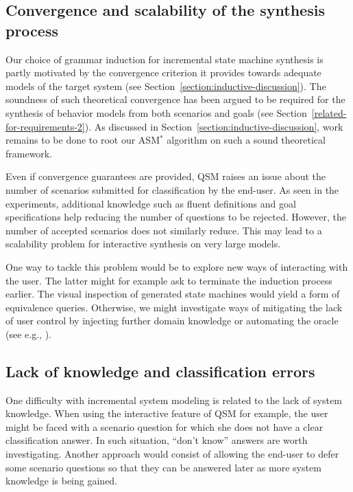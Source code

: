 \subsection*{Convergence and scalability of the synthesis process}

Our choice of grammar induction for incremental state machine synthesis is partly motivated by the convergence criterion it provides towards adequate models of the target system (see Section~\ref{section:inductive-discussion}). The soundness of such theoretical convergence has been argued to be required for the synthesis of behavior models from both scenarios and goals (see Section~\ref{related-for-requirements-2}). As discussed in Section~\ref{section:inductive-discussion}, work remains to be done to root our ASM$^*$ algorithm on such a sound theoretical framework.

Even if convergence guarantees are provided, QSM raises an issue about the number of scenarios submitted for classification by the end-user. As seen in the experiments, additional knowledge such as fluent definitions and goal specifications help reducing the number of questions to be rejected. However, the number of accepted scenarios does not similarly reduce. This may lead to a scalability problem for interactive synthesis on very large models.

One way to tackle this problem would be to explore new ways of interacting with the user. The latter might for example ask to terminate the induction process earlier. The visual inspection of generated state machines would yield a form of equivalence queries. Otherwise, we might investigate ways of mitigating the lack of user control by injecting further domain knowledge or automating the oracle (see e.g., \cite{Walkinshaw:2007}).

\subsection*{Lack of knowledge and classification errors}

One difficulty with incremental system modeling is related to the lack of system knowledge. When using the interactive feature of QSM for example, the user might be faced with a scenario question for which she does not have a clear classification answer. In such situation, ``don't know'' answers are worth investigating. Another approach would consist of allowing the end-user to defer some scenario questions so that they can be answered later as more system knowledge is being gained.


